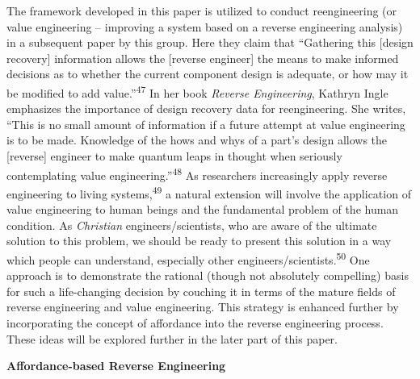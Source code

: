 The framework developed in this paper is utilized to conduct
reengineering (or value engineering – improving a system based on a
reverse engineering analysis) in a subsequent paper by this group. Here
they claim that “Gathering this [design recovery] information allows
the [reverse engineer] the means to make informed decisions as to
whether the current component design is adequate, or how may it be
modified to add value.”\textsuperscript{47} In her book \textit{Reverse
Engineering}, Kathryn Ingle emphasizes the importance of design
recovery data for reengineering. She writes, “This is no small amount
of information if a future attempt at value engineering is to be made.
Knowledge of the hows and whys of a part’s design allows the [reverse]
engineer to make quantum leaps in thought when seriously contemplating
value engineering.”\textsuperscript{48} As researchers increasingly
apply reverse engineering to living systems,\textsuperscript{49} a
natural extension will involve the application of value engineering to
human beings and the fundamental problem of the human condition. As
\textit{Christian} engineers/scientists, who are aware of the ultimate
solution to this problem, we should be ready to present this solution
in a way which people can understand, especially other
engineers/scientists.\textsuperscript{50} One approach is to
demonstrate the rational (though not absolutely compelling) basis for
such a life-changing decision by couching it in terms of the mature
fields of reverse engineering and value engineering. This strategy is
enhanced further by incorporating the concept of affordance into the
reverse engineering process. These ideas will be explored further in
the later part of this paper.


\bigskip


\textbf{Affordance-based Reverse Engineering}


